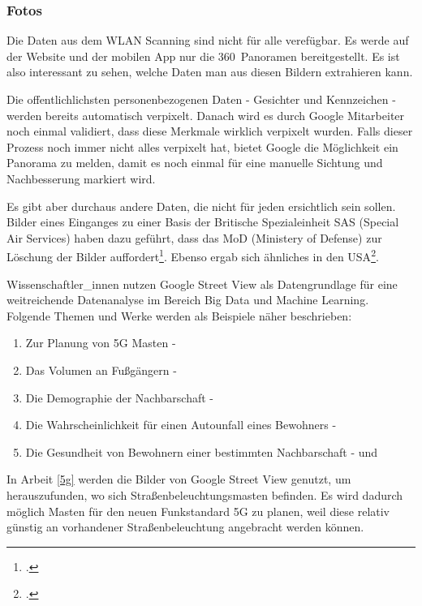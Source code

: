 \subsubsection{Fotos}

Die Daten aus dem WLAN Scanning sind nicht für alle verefügbar. Es werde auf der
Website und der mobilen App nur die 360\degree\ Panoramen bereitgestellt. Es ist
also interessant zu sehen, welche Daten man aus diesen Bildern extrahieren kann.

Die offentlichlichsten personenbezogenen Daten - Gesichter und Kennzeichen -
werden bereits automatisch verpixelt. Danach wird es durch Google Mitarbeiter
noch einmal validiert, dass diese Merkmale wirklich verpixelt wurden. Falls
dieser Prozess noch immer nicht alles verpixelt hat, bietet Google die
Möglichkeit ein Panorama zu melden, damit es noch einmal für eine manuelle
Sichtung und Nachbesserung markiert wird.

Es gibt aber durchaus andere Daten, die nicht für jeden ersichtlich sein sollen.
Bilder eines Einganges zu einer Basis der Britische Spezialeinheit SAS (Special
Air Services) haben dazu geführt, dass das MoD (Ministery of Defense) zur
Löschung der Bilder auffordert\footcite{website:bbc:herefordshire}. Ebenso ergab
sich ähnliches in den USA\footcite{website:reuters:pentagon-takedown-notice}.

Wissenschaftler\_innen nutzen Google Street View als Datengrundlage für eine
weitreichende Datenanalyse im Bereich Big Data und Machine Learning. Folgende
Themen und Werke werden als Beispiele näher beschrieben:

\begin{enumerate}
  \item Zur Planung von 5G Masten - \cite{Zhang_2020}\label{5g}
  \item Das Volumen an Fußgängern - \cite{YIN2015337}\label{pedestrian-volume}
  \item Die Demographie der Nachbarschaft - \cite{Gebru13108}\label{demographics}
  \item Die Wahrscheinlichkeit für einen Autounfall eines Bewohners - \cite{kita2019google}\label{car-accident}
  \item Die Gesundheit von Bewohnern einer bestimmten
  Nachbarschaft - \cite{8933431} und \cite{DBLP:journals/corr/abs-1905-06464}\label{health}
\end{enumerate}

In Arbeit \ref{5g} werden die Bilder von Google Street View genutzt, um
herauszufunden, wo sich Straßenbeleuchtungsmasten befinden. Es wird dadurch
möglich Masten für den neuen Funkstandard 5G zu planen, weil diese relativ
günstig an vorhandener Straßenbeleuchtung angebracht werden können.

